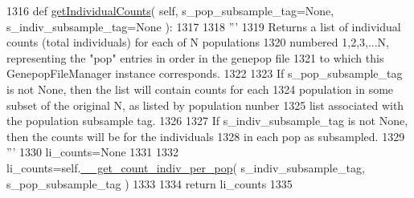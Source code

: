 \begin{DoxyCode}
1316     \textcolor{keyword}{def }\hyperlink{classnegui_1_1genepopfilemanager_1_1GenepopFileManager_aca743749002b9828cd66730e42db4387}{getIndividualCounts}( self, s\_pop\_subsample\_tag=None, s\_indiv\_subsample\_tag=None 
      ):
1317 
1318         \textcolor{stringliteral}{'''}
1319 \textcolor{stringliteral}{        Returns a list of individual counts (total individuals) for each of N populations}
1320 \textcolor{stringliteral}{        numbered 1,2,3,...N, representing the "pop" entries in order in the genepop file}
1321 \textcolor{stringliteral}{        to which this GenepopFileManager instance corresponds.}
1322 \textcolor{stringliteral}{}
1323 \textcolor{stringliteral}{        If s\_pop\_subsample\_tag is not None, then the list will contain counts for each}
1324 \textcolor{stringliteral}{        population in some subset of the original N, as listed by population nunber }
1325 \textcolor{stringliteral}{        list associated with the population subsample tag.}
1326 \textcolor{stringliteral}{}
1327 \textcolor{stringliteral}{        If s\_indiv\_subsample\_tag is not None, then the counts will be for the individuals}
1328 \textcolor{stringliteral}{        in each pop as subsampled.}
1329 \textcolor{stringliteral}{        '''}
1330         li\_counts=\textcolor{keywordtype}{None}
1331 
1332         li\_counts=self.\hyperlink{classnegui_1_1genepopfilemanager_1_1GenepopFileManager_a8efe11151549d7da2bc024f836491af4}{\_\_get\_count\_indiv\_per\_pop}( s\_indiv\_subsample\_tag, 
      s\_pop\_subsample\_tag ) 
1333 
1334         \textcolor{keywordflow}{return} li\_counts
1335 
\end{DoxyCode}
